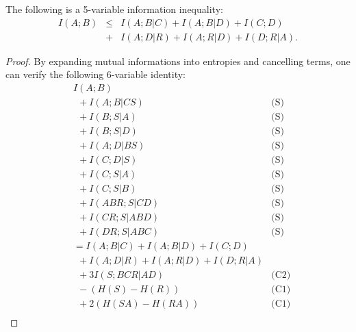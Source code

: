 \documentclass[10pt,journal]{IEEEtran}
\begin{document}
\begin{lemma}\label{le:1}
The following is a 5-variable information inequality:
\begin{eqnarray*}
    I(A;B) &\leq& I(A;B|C)+I(A;B|D)+I(C;D)\\
    &+& I(A;D|R)+I(A;R|D)+I(D;R|A).
\end{eqnarray*}
\end{lemma}
\begin{proof}
By expanding mutual informations into entropies and cancelling
terms, one can verify the following 6-variable identity:
\begin{align*}
      & I(A;B)  & \\
       &\ \ + I(A;B|CS)   &                                                           \text{(S)} \\
       &\ \ + I(B;S|A)     &                                                          \text{(S)}  \\
       &\ \ + I(B;S|D)      &                                                          \text{(S)}  \\
       &\ \ + I(A;D|BS)       &                                                       \text{(S)}  \\
       &\ \ + I(C;D|S)     &                                                           \text{(S)}  \\
       &\ \ + I(C;S|A)     &                                                           \text{(S)}  \\
       &\ \ + I(C;S|B)     &                                                           \text{(S)}  \\
      &\ \  + I(ABR;S|CD)     &                                                        \text{(S)}  \\
      &\ \  + I(CR;S|ABD)     &                                                        \text{(S)} \\
      &\ \  + I(DR;S|ABC)     &                                                        \text{(S)}  \\
   &= I(A;B|C)+I(A;B|D)+I(C;D)   \\
   &\ \ +I(A;D|R)+I(A;R|D)+I(D;R|A)\\
       &\ \ + 3I(S;BCR|AD)      &                                                      \text{(C2)}  \\
       &\ \ - (H(S)-H(R))     &                                                        \text{(C1)}  \\
       &\ \ + 2(H(SA)-H(RA))      &                                                    \text{(C1)}  \\

\end{align*}
\end{proof}
\end{document}
